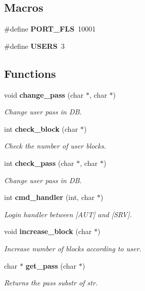 \subsection*{Macros}
\begin{DoxyCompactItemize}
\item 
\#define \textbf{ P\+O\+R\+T\+\_\+\+F\+LS}~10001
\item 
\#define \textbf{ U\+S\+E\+RS}~3
\end{DoxyCompactItemize}
\subsection*{Functions}
\begin{DoxyCompactItemize}
\item 
void \textbf{ change\+\_\+pass} (char $\ast$, char $\ast$)
\begin{DoxyCompactList}\small\item\em Change user pass in DB. \end{DoxyCompactList}\item 
int \textbf{ check\+\_\+block} (char $\ast$)
\begin{DoxyCompactList}\small\item\em Check the number of user blocks. \end{DoxyCompactList}\item 
int \textbf{ check\+\_\+pass} (char $\ast$, char $\ast$)
\begin{DoxyCompactList}\small\item\em Change user pass in DB. \end{DoxyCompactList}\item 
int \textbf{ cmd\+\_\+handler} (int, char $\ast$)
\begin{DoxyCompactList}\small\item\em Login handler between [A\+UT] and [S\+RV]. \end{DoxyCompactList}\item 
void \textbf{ increase\+\_\+block} (char $\ast$)
\begin{DoxyCompactList}\small\item\em Increase number of blocks according to user. \end{DoxyCompactList}\item 
char $\ast$ \textbf{ get\+\_\+pass} (char $\ast$)
\begin{DoxyCompactList}\small\item\em Returns the pass substr of str. \end{DoxyCompactList}\item 

\end{DoxyCompactItemize}
